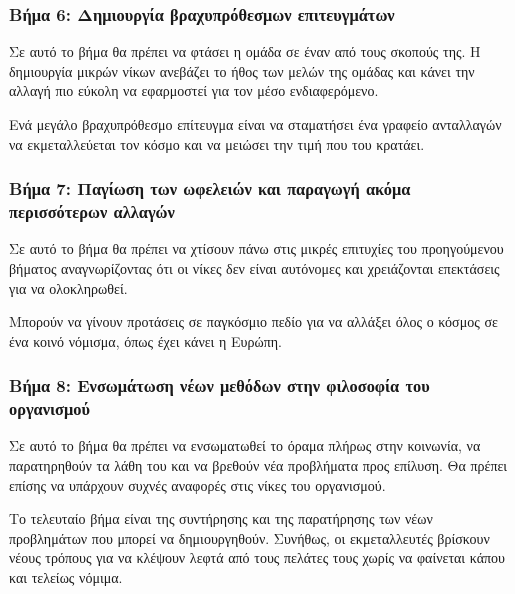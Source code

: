 \subsubsection{Βήμα 6: Δημιουργία βραχυπρόθεσμων επιτευγμάτων}

\begin{problem}
  Σε αυτό το βήμα θα πρέπει να φτάσει η ομάδα σε έναν από τους σκοπούς της. Η δημιουργία μικρών νίκων ανεβάζει το ήθος των μελών της ομάδας και κάνει την αλλαγή πιο εύκολη να εφαρμοστεί για τον μέσο ενδιαφερόμενο.
\end{problem}

Ενά μεγάλο βραχυπρόθεσμο επίτευγμα είναι να σταματήσει ένα γραφείο ανταλλαγών να εκμεταλλεύεται τον κόσμο και να μειώσει την τιμή που του κρατάει.

\subsubsection{Βήμα 7: Παγίωση των ωφελειών και παραγωγή ακόμα περισσότερων αλλαγών}

\begin{problem}
  Σε αυτό το βήμα θα πρέπει να χτίσουν πάνω στις μικρές επιτυχίες του προηγούμενου βήματος αναγνωρίζοντας ότι οι νίκες δεν είναι αυτόνομες και χρειάζονται επεκτάσεις για να ολοκληρωθεί.
\end{problem}

Μπορούν να γίνουν προτάσεις σε παγκόσμιο πεδίο για να αλλάξει όλος ο κόσμος σε ένα κοινό νόμισμα, όπως έχει κάνει η Ευρώπη.

\subsubsection{Βήμα 8: Ενσωμάτωση νέων μεθόδων στην φιλοσοφία του οργανισμού}

\begin{problem}
  Σε αυτό το βήμα θα πρέπει να ενσωματωθεί το όραμα πλήρως στην κοινωνία, να παρατηρηθούν τα λάθη του και να βρεθούν νέα προβλήματα προς επίλυση. Θα πρέπει επίσης να υπάρχουν συχνές αναφορές στις νίκες του οργανισμού.
\end{problem}

Το τελευταίο βήμα είναι της συντήρησης και της παρατήρησης των νέων προβλημάτων που μπορεί να δημιουργηθούν. Συνήθως, οι εκμεταλλευτές βρίσκουν νέους τρόπους για να κλέψουν λεφτά από τους πελάτες τους χωρίς να φαίνεται κάπου και τελείως νόμιμα.